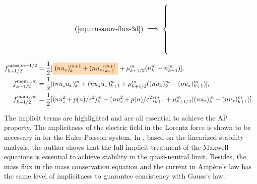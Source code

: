 \documentclass{article}
\newcommand{\mycolorbox}[2]{\colorbox{#1}{$\displaystyle#2$}}
\begin{document}
\hspace{0.2cm}\begin{minipage}{0.1\textwidth}
    \begin{align*}
        (\ref{equ:rusanov-flux-3d}) &\implies \begin{cases}
         \\
         \\
         \\
         \\
         \\
        \end{cases}
    \end{align*}
\end{minipage}
\begin{minipage}{0.6\textwidth}
    \begin{align*}
    f^{\text{mass},m+1/2}_{k+1/2} & = \frac{1}{2}[\mycolorbox{orange!30}{(nu_z)^{m+1}_k + (nu_z)^{m+1}_{k+1}} + \mu^m_{k+1/2}(n^m_k - n^m_{k+1})], \\
    f^{\text{mom}_x,m}_{k+1/2} & = \frac{1}{2}[(nu_zu_x)^{m}_k + (nu_zu_x)^{m}_{k+1} + \mu^m_{k+1/2}((nu_x)^m_k - (nu_x)^m_{k+1})], \\
    f^{\text{mom}_z,m}_{k+1/2} & = \frac{1}{2}[(nu_z^2 + p(n)/\varepsilon^2)^{m}_k + (nu_z^2 + p(n)/\varepsilon^2)^{m}_{k+1} + \mu^m_{k+1/2}((nu_z)^m_k - (nu_z)^m_{k+1})].
\end{align*}
\end{minipage}

The implicit terms are highlighted and are all essential to achieve the AP property. The implicitness of the electric field in the Lorentz force is shown to be necessary in \cite{fabre_1992} for the Euler-Poisson system. In \cite{degond_2012}, based on the linearized stability analysis, the author shows that the full-implicit treatment of the Maxwell equations is essential to achieve stability in the quasi-neutral limit. Besides, the mass flux in the mass conservation equation and the current in Amp\`{e}re's law has the same level of implicitness to guarantee consistency with Gauss's law.  
\end{document}
